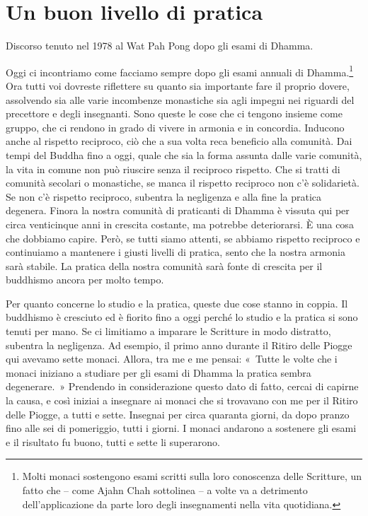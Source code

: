 \chapter{Un buon livello di pratica}

\begin{openingQuote}
  \centering

  Discorso tenuto nel 1978 al Wat Pah Pong dopo gli esami di Dhamma.
\end{openingQuote}

Oggi ci incontriamo come facciamo sempre dopo gli esami annuali di
Dhamma.\footnote{Molti monaci sostengono esami scritti sulla loro
  conoscenza delle Scritture, un fatto che -- come Ajahn Chah sottolinea
  -- a volte va a detrimento dell'applicazione da parte loro degli
  insegnamenti nella vita quotidiana.} Ora tutti voi dovreste riflettere
su quanto sia importante fare il proprio dovere, assolvendo sia alle
varie incombenze monastiche sia agli impegni nei riguardi del precettore
e degli insegnanti. Sono queste le cose che ci tengono insieme come
gruppo, che ci rendono in grado di vivere in armonia e in concordia.
Inducono anche al rispetto reciproco, ciò che a sua volta reca beneficio
alla comunità. Dai tempi del Buddha fino a oggi, quale che sia la forma
assunta dalle varie comunità, la vita in comune non può riuscire senza
il reciproco rispetto. Che si tratti di comunità secolari o monastiche,
se manca il rispetto reciproco non c'è solidarietà. Se non c'è rispetto
reciproco, subentra la negligenza e alla fine la pratica degenera.
Finora la nostra comunità di praticanti di Dhamma è vissuta qui per
circa venticinque anni in crescita costante, ma potrebbe deteriorarsi. È
una cosa che dobbiamo capire. Però, se tutti siamo attenti, se abbiamo
rispetto reciproco e continuiamo a mantenere i giusti livelli di
pratica, sento che la nostra armonia sarà stabile. La pratica della
nostra comunità sarà fonte di crescita per il buddhismo ancora per molto
tempo.

Per quanto concerne lo studio e la pratica, queste due cose stanno in
coppia. Il buddhismo è cresciuto ed è fiorito fino a oggi perché lo
studio e la pratica si sono tenuti per mano. Se ci limitiamo a imparare
le Scritture in modo distratto, subentra la negligenza. Ad esempio, il
primo anno durante il Ritiro delle Piogge qui avevamo sette monaci.
Allora, tra me e me pensai: «~Tutte le volte che i monaci iniziano a
studiare per gli esami di Dhamma la pratica sembra degenerare.~»
Prendendo in considerazione questo dato di fatto, cercai di capirne la
causa, e così iniziai a insegnare ai monaci che si trovavano con me per
il Ritiro delle Piogge, a tutti e sette. Insegnai per circa quaranta
giorni, da dopo pranzo fino alle sei di pomeriggio, tutti i giorni. I
monaci andarono a sostenere gli esami e il risultato fu buono, tutti e
sette li superarono.

